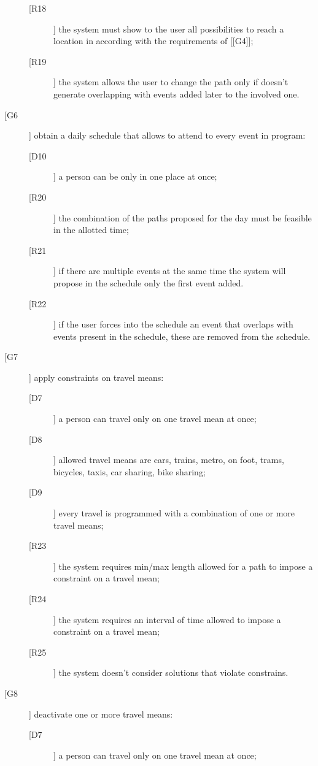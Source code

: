 \begin{description}
\begin{description}
	\newline
	\item[[R18]] the system must show to the user all possibilities to reach a location in according with the requirements of [[G4]];
	\item[[R19]] the system allows the user to change the path only if doesn’t generate overlapping with events added later to the involved one.
	\end{description}
\item[[G6]] obtain a daily schedule that allows to attend to every event in program:
	\begin{description}
	\item[[D10]] a person can be only in one place at once;
	\newline
	\item[[R20]] the combination of the paths proposed for the day must be feasible in the allotted time;
	\item[[R21]] if there are multiple events at the same time the system will propose in the schedule only the first event added.
	\item[[R22]] if the user forces into the schedule an event that overlaps with events present in the schedule, these are removed from the schedule.
	\end{description}
\item[[G7]] apply constraints on travel means:
	\begin{description}
	\item[[D7]] a person can travel only on one travel mean at once; 
	\item[[D8]] allowed travel means are cars, trains, metro, on foot, trams, bicycles, taxis, car sharing, bike sharing;	
	\item[[D9]] every travel is programmed with a combination of one or more travel means;
	\newline
	\item[[R23]] the system requires min/max length allowed for a path to impose a constraint on a travel mean;
	\item[[R24]] the system requires an interval of time allowed to impose a constraint on a travel mean;
	\item[[R25]] the system doesn’t consider solutions that violate constrains.
	\end{description}
\item[[G8]] deactivate one or more travel means:
	\begin{description}
	\item[[D7]] a person can travel only on one travel mean at once; 

\end{description}
\end{description}
